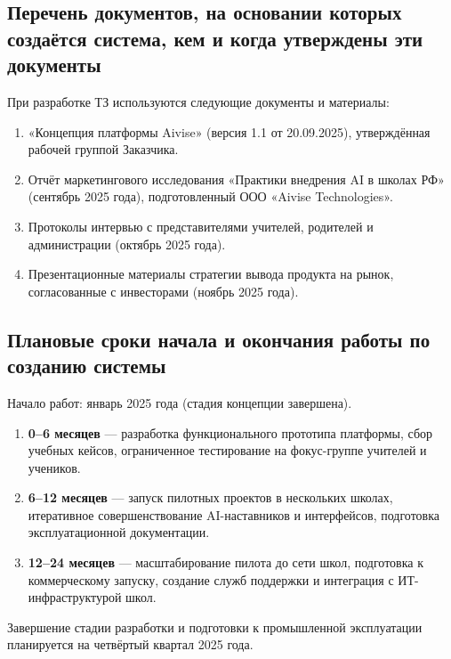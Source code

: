 \documentclass[14pt,a4paper]{extarticle}
\begin{document}
\subsection{Перечень документов, на основании которых создаётся система, кем и когда утверждены эти документы}
При разработке ТЗ используются следующие документы и материалы:
\begin{enumerate}
  \item «Концепция платформы Aivise» (версия 1.1 от 20.09.2025), утверждённая рабочей группой Заказчика.
  \item Отчёт маркетингового исследования «Практики внедрения AI в школах РФ» (сентябрь 2025 года), подготовленный ООО «Aivise Technologies».
  \item Протоколы интервью с представителями учителей, родителей и администрации (октябрь 2025 года).
  \item Презентационные материалы стратегии вывода продукта на рынок, согласованные с инвесторами (ноябрь 2025 года).
\end{enumerate}

\subsection{Плановые сроки начала и окончания работы по созданию системы}
Начало работ: январь 2025 года (стадия концепции завершена).
\begin{enumerate}
  \item \textbf{0–6 месяцев} — разработка функционального прототипа платформы, сбор учебных кейсов, ограниченное тестирование на фокус-группе учителей и учеников.
  \item \textbf{6–12 месяцев} — запуск пилотных проектов в нескольких школах, итеративное совершенствование AI-наставников и интерфейсов, подготовка эксплуатационной документации.
  \item \textbf{12–24 месяцев} — масштабирование пилота до сети школ, подготовка к коммерческому запуску, создание служб поддержки и интеграция с ИТ-инфраструктурой школ.
\end{enumerate}
Завершение стадии разработки и подготовки к промышленной эксплуатации планируется на четвёртый квартал 2025 года.
\end{document}
